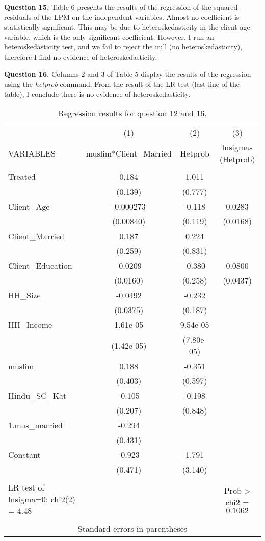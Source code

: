 \documentclass{article}
\theoremstyle{definition}
\begin{document}
\textbf{Question 15.} Table 6 presents the results of the regression of the squared residuals of the  LPM on the independent variables. Almost no coefficient is statistically significant. This may be due to heteroskedasticity in the client age variable, which is the only significant coefficient. However, I run an heteroskedasticity test, and we fail to reject the null (no heteroskedasticity), therefore I find no evidence of heteroskedasticity.


\textbf{Question 16.} Columns 2 and 3 of Table 5 display the results of the regression using the \textit{hetprob} command. From the result of the LR test (last line of the table),  I conclude there is no evidence of heteroskedasticity.

\begin{table}[htbp]\centering
\begin{tabular}{lccc} \hline
 & (1) & (2) & (3) \\
VARIABLES & muslim*Client\_Married & Hetprob & lnsigmas (Hetprob) \\ \hline
 &  &  &  \\
Treated & 0.184 & 1.011 &  \\
 & (0.139) & (0.777) &  \\
Client\_Age & -0.000273 & -0.118 & 0.0283 \\
 & (0.00840) & (0.119) & (0.0168) \\
Client\_Married & 0.187 & 0.224 &  \\
 & (0.259) & (0.831) &  \\
Client\_Education & -0.0209 & -0.380 & 0.0800 \\
 & (0.0160) & (0.258) & (0.0437) \\
HH\_Size & -0.0492 & -0.232 &  \\
 & (0.0375) & (0.187) &  \\
HH\_Income & 1.61e-05 & 9.54e-05 &  \\
 & (1.42e-05) & (7.80e-05) &  \\
muslim & 0.188 & -0.351 &  \\
 & (0.403) & (0.597) &  \\
Hindu\_SC\_Kat & -0.105 & -0.198 &  \\
 & (0.207) & (0.848) &  \\
1.mus\_married & -0.294 &  &  \\
 & (0.431) &  &  \\
Constant & -0.923 & 1.791 &  \\
 & (0.471) & (3.140) &  \\
 &  &  &  \\ \hline
  LR test of lnsigma=0: chi2(2) = 4.48 &        &    &         Prob > chi2 = $0.1062$\\
  &  &  &  \\ \hline
\multicolumn{4}{c}{ Standard errors in parentheses} \\
\end{tabular}
\caption{Regression results for question 12 and 16.}
\end{table}
\end{document}

